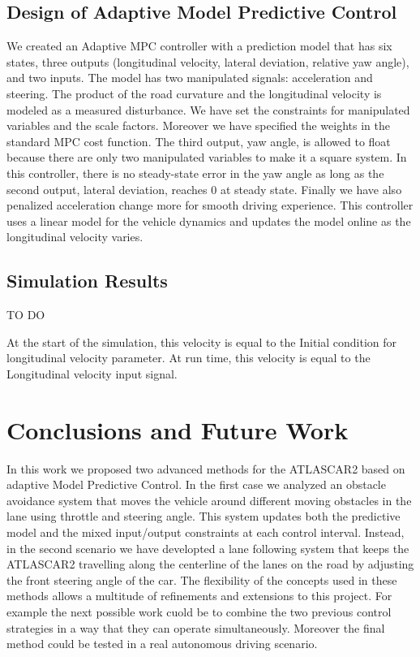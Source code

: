 \documentclass[conference, 11pt]{IEEEtran}
\begin{document}
\subsection{Design of Adaptive Model Predictive Control}
We created an Adaptive MPC controller with a prediction model that has six states, three outputs (longitudinal velocity, lateral deviation, relative yaw angle), and two inputs. The model has two manipulated signals: acceleration and steering. The product of the road curvature and the longitudinal velocity is modeled as a measured disturbance. We have set the constraints for manipulated variables and the scale factors. Moreover we have specified the weights in the standard MPC cost function. The third output, yaw angle, is allowed to float because there are only two manipulated variables to make it a square system. In this controller, there is no steady-state error in the yaw angle as long as the second output, lateral deviation, reaches 0 at steady state. Finally we have also penalized acceleration change more for smooth driving experience. This controller uses a linear model for the vehicle dynamics and updates the model online as the longitudinal velocity varies.



\subsection{Simulation Results}

TO DO


At the start of the simulation, this velocity is equal to the Initial condition for longitudinal velocity parameter. At run time, this velocity is equal to the Longitudinal velocity input signal.




\section{Conclusions and Future Work}
In this work we proposed two advanced methods for the ATLASCAR2 based on adaptive Model Predictive Control. In the first case we analyzed an obstacle avoidance system that moves the vehicle around different moving obstacles in the lane using throttle and steering angle. This system updates both the predictive model and the mixed input/output constraints at each control interval. Instead, in the second scenario  we have developted a lane following system that keeps the ATLASCAR2 travelling along the centerline of the lanes on the road by adjusting the front steering angle of the car. The flexibility of the concepts used in these methods allows a multitude of refinements and extensions to this project. For example the next possible work cuold be to combine the two previous control strategies in a way that they can operate simultaneously. Moreover the final method could be tested in a real autonomous driving scenario.
\end{document}
